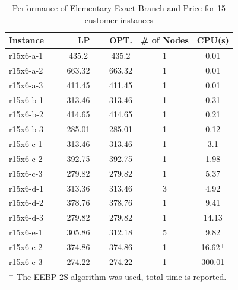 \documentclass[graybox]{./styles/svmult}
\begin{document}
\begin{table}[ht]
\centering
\caption{Performance of Elementary Exact Branch-and-Price for 15 customer instances}\label{gr2-15}
\begin {tabular}[t]{|l|c|c|c|c|}  
\hline
Instance & LP & OPT. & \# of Nodes & CPU(s) \\\hline
r15x6-a-1 \ \	&	435.2 \ \	&	435.2	&	1	&	0.01	\\
r15x6-a-2 \ \	&	663.32 \ \	&	663.32	&	1	&	0.01	\\
r15x6-a-3 \ \	&	411.45 \ \	&	411.45	&	1	&	0.01	\\
r15x6-b-1 \ \	&	313.46 \ \	&	313.46	&	1	&	0.31	\\
r15x6-b-2 \ \	&	414.65 \ \	&	414.65	&	1	&	0.21	\\
r15x6-b-3 \ \	&	285.01 \ \	&	285.01	&	1	&	0.12	\\
r15x6-c-1 \ \	&	313.46 \ \	&	313.46	&	1	&	3.1	\\
r15x6-c-2 \ \	&	392.75 \ \	&	392.75	&	1	&	1.98	\\
r15x6-c-3 \ \	&	279.82 \ \	&	279.82	&	1	&	5.37	\\
r15x6-d-1 \ \	&	313.36 \ \	&	313.46	&	3	&	4.92	\\
r15x6-d-2 \ \	&	378.76 \ \	&	378.76	&	1	&	9.41	\\
r15x6-d-3 \ \	&	279.82 \ \	&	279.82	&	1	&	14.13	\\
r15x6-e-1 \ \	&	305.86 \ \	&	312.18	&	5	&	9.82	\\
r15x6-e-2$^+$ \ \	&	374.86 \ \	&	374.86	&	1	&	16.62$^+$	\\
r15x6-e-3 \ \	&	274.22	 \ \ &	274.22	&	1	&	300.01	\\
\hline
\multicolumn{5}{l}{$^+$ The EEBP-2S algorithm was used, total time is reported.}\\
\end{tabular}
\end{table} 
\end{document}
